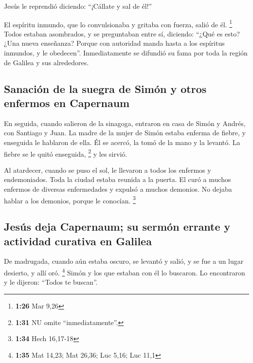  Jesús le reprendió diciendo: ``¡Cállate y sal de él!''

 El espíritu inmundo, que lo convulsionaba y gritaba con
fuerza, salió de él. \footnote{\textbf{1:26} Mar 9,26} 
Todos estaban asombrados, y se preguntaban entre sí, diciendo: ``¿Qué es
esto? ¿Una nueva enseñanza? Porque con autoridad manda hasta a los
espíritus inmundos, y le obedecen''.  Inmediatamente se
difundió su fama por toda la región de Galilea y sus alrededores.

\hypertarget{sanaciuxf3n-de-la-suegra-de-simuxf3n-y-otros-enfermos-en-capernaum}{%
\subsection{Sanación de la suegra de Simón y otros enfermos en
Capernaum}\label{sanaciuxf3n-de-la-suegra-de-simuxf3n-y-otros-enfermos-en-capernaum}}

 En seguida, cuando salieron de la sinagoga, entraron en
casa de Simón y Andrés, con Santiago y Juan.  La madre de
la mujer de Simón estaba enferma de fiebre, y enseguida le hablaron de
ella.  Él se acercó, la tomó de la mano y la levantó. La
fiebre se le quitó enseguida, \footnote{\textbf{1:31} NU omite
  ``inmediatamente''.} y les sirvió.

 Al atardecer, cuando se puso el sol, le llevaron a todos
los enfermos y endemoniados.  Toda la ciudad estaba
reunida a la puerta.  El curó a muchos enfermos de
diversas enfermedades y expulsó a muchos demonios. No dejaba hablar a
los demonios, porque le conocían. \footnote{\textbf{1:34} Hech 16,17-18}

\hypertarget{jesuxfas-deja-capernaum-su-sermuxf3n-errante-y-actividad-curativa-en-galilea}{%
\subsection{Jesús deja Capernaum; su sermón errante y actividad curativa
en
Galilea}\label{jesuxfas-deja-capernaum-su-sermuxf3n-errante-y-actividad-curativa-en-galilea}}

 De madrugada, cuando aún estaba oscuro, se levantó y
salió, y se fue a un lugar desierto, y allí oró. \footnote{\textbf{1:35}
  Mat 14,23; Mat 26,36; Luc 5,16; Luc 11,1}  Simón y los
que estaban con él lo buscaron.  Lo encontraron y le
dijeron: ``Todos te buscan''.

